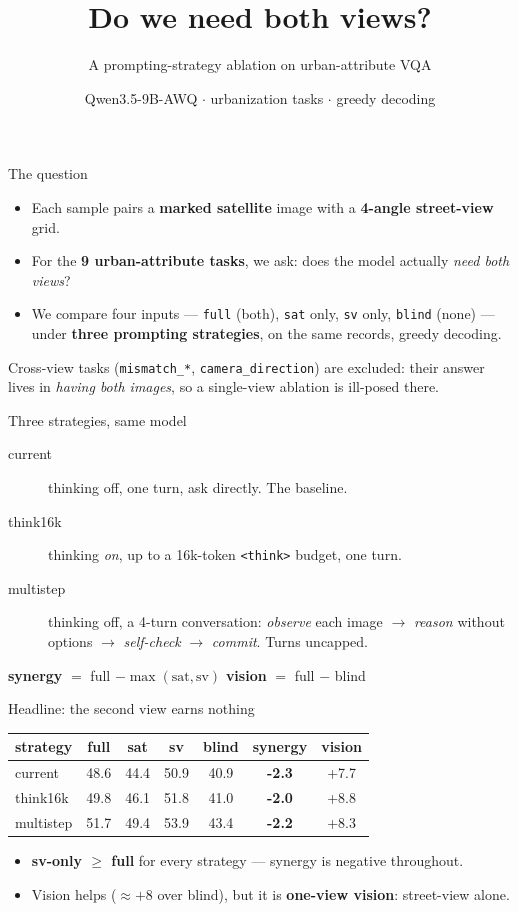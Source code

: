 \documentclass[aspectratio=169]{beamer}
\title{Do we need both views?}
\subtitle{A prompting-strategy ablation on urban-attribute VQA}
\author{Qwen3.5-9B-AWQ \;$\cdot$\; 9 urbanization tasks \;$\cdot$\; greedy decoding}
\date{}
\newcommand{\hl}[1]{\textbf{\textcolor{accent}{#1}}}
\begin{document}
\maketitle
\begin{frame}{The question}
\begin{itemize}
  \item Each sample pairs a \hl{marked satellite} image with a \hl{4-angle street-view} grid.
  \item For the \hl{9 urban-attribute tasks}, we ask: does the model actually \emph{need both views}?
  \item We compare four inputs --- \texttt{full} (both), \texttt{sat} only, \texttt{sv} only, \texttt{blind} (none) ---
        under \hl{three prompting strategies}, on the same records, greedy decoding.
\end{itemize}
\vfill
\footnotesize Cross-view tasks (\texttt{mismatch\_*}, \texttt{camera\_direction}) are excluded:
their answer lives in \emph{having both images}, so a single-view ablation is ill-posed there.
\end{frame}
\begin{frame}{Three strategies, same model}
\begin{description}
  \item[current] thinking off, one turn, ask directly. The baseline.
  \item[think16k] thinking \emph{on}, up to a 16k-token \texttt{<think>} budget, one turn.
  \item[multistep] thinking off, a 4-turn conversation: \emph{observe} each image $\to$
        \emph{reason} without options $\to$ \emph{self-check} $\to$ \emph{commit}. Turns uncapped.
\end{description}
\vfill
\centering\footnotesize \textbf{synergy} $=$ full $-\max(\text{sat},\text{sv})$ \quad
\textbf{vision} $=$ full $-$ blind
\end{frame}
\begin{frame}{Headline: the second view earns nothing}
\centering
\begin{tabular}{lcccc>{\bfseries}cc}
\toprule
strategy & full & sat & sv & blind & synergy & vision \\
\midrule
current & 48.6 & 44.4 & 50.9 & 40.9 & \textcolor{bad}{-2.3} & +7.7 \\
think16k & 49.8 & 46.1 & 51.8 & 41.0 & \textcolor{bad}{-2.0} & +8.8 \\
multistep & 51.7 & 49.4 & 53.9 & 43.4 & \textcolor{bad}{-2.2} & +8.3 \\
\bottomrule
\end{tabular}
\vfill
\begin{itemize}
  \item \hl{sv-only $\geq$ full} for every strategy --- synergy is \textcolor{bad}{negative} throughout.
  \item Vision helps ($\approx +8$ over blind), but it is \hl{one-view vision}: street-view alone.
\end{itemize}
\end{frame}
\end{document}
